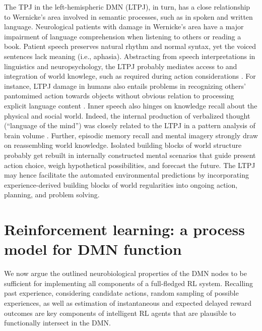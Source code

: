 \documentclass[10pt,letterpaper]{article}
\begin{document}
The TPJ in the left-hemispheric DMN (LTPJ),
in turn, has a close relationship to Wernicke's area
involved in semantic processes, such as in spoken and written language.
Neurological patients with damage in Wernicke's area
have a major impairment of language comprehension
when listening to others or reading a book.
Patient speech
preserves natural rhythm and normal syntax, yet the
voiced sentences lack meaning (i.e., aphasia).
Abstracting from speech interpretations in linguistics
and neuropsychology,
the LTPJ probably mediates access to and integration of world knowlege,
such as required during action considerations
\citep{binder2011neurobiology, seghier2013angular}.
For instance, LTPJ damage in humans also entails problems in recognizing
others' pantomimed action towards objects
without obvious relation to processing explicit language content
\citep{varney1987locus}.
%
Inner speech also hinges on knowledge recall
about the physical and social world.
Indeed,
the internal production of
verbalized thought (``language of the mind'') was closely related to the LTPJ
in a pattern analysis of brain volume
\citep{geva2011neural}.
Further,
episodic memory recall and mental imagery strongly draw on
reassembling world knowledge.
Isolated building blocks of world structure probably get rebuilt
in internally constructed mental scenarios that
guide present action choice,
weigh hypothetical possibilities, and forecast the future.
%
The LTPJ may hence facilitate the automated environmental predictions
by incorporating experience-derived building blocks of world regularities
into ongoing action, planning, and problem solving.



\section{Reinforcement learning: a process model for DMN function}
We now argue the outlined neurobiological properties
of the DMN nodes
to be sufficient for implementing all components
of a full-fledged RL system.
Recalling past experience, considering candidate actions,
random sampling of possible experiences, as well as
estimation of instantaneous and expected delayed reward outcomes
are key components of intelligent RL agents
that are plausible to functionally intersect in the DMN.
\end{document}
